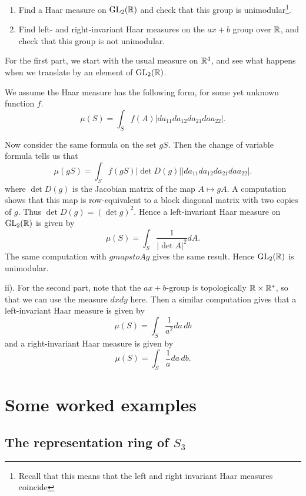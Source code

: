 \documentclass[11pt, english]{article}
\begin{document}
\begin{exc}
  \begin{enumerate}
  \item Find a Haar measure on $\operatorname{GL}_2(\mathbb{R})$ and check that this group is unimodular\footnote{Recall that this means that the left and right invariant Haar measures coincide}.
\item Find left- and right-invariant Haar measures on the $ax+b$ group over $\mathbb{R}$, and check that this group is not unimodular.
  \end{enumerate}
\end{exc}
\begin{sol}
For the first part, we start with the usual measure on $\mathbb{R}^4$, and see what happens when we translate by an element of $\operatorname{GL}_2(\mathbb{R})$. 

We assume the Haar measure has the following form, for some yet unknown function $f$.
$$
\mu(S) = \int_S f(A) \lvert da_{11} d a_{12} da_{21} da a_{22} \rvert.
$$

Now consider the same formula on the set $gS$. Then the change of variable formula tells us that
$$
\mu(gS) = \int_S f(gS) \lvert \det D(g) \rvert \lvert da_{11} d a_{12} da_{21} da a_{22} \rvert.
$$
where $\det D(g)$ is the Jacobian matrix of the map $A \mapsto gA$. A computation shows that this map is row-equivalent to a block diagonal matrix with two copies of $g$. Thus $\det D(g) = (\det g)^2$. Hence a left-invariant Haar measure on $\operatorname{GL}_2(\mathbb{R})$ is given by
$$
\mu(S) = \int_S \frac{1}{\lvert \det A\rvert ^2} dA.
$$
The same computation with $g mapsto Ag$ gives the same result. Hence $\operatorname{GL}_2(\mathbb{R})$ is unimodular.

ii). For the second part, note that the $ax+b$-group is topologically $\mathbb{R} \times \mathbb{R}^\ast$, so that we can use the measure $dxdy$ here. Then a similar computation gives that a left-invariant Haar measure is given by
$$
\mu(S) = \int_S \frac{1}{a^2} da\, db
$$
and a right-invariant Haar measure is given by
$$
\mu(S) = \int_S \frac{1}{a} da\, db.
$$

\end{sol}


\section{Some worked examples}

\subsection{The representation ring of $S_3$}
\end{document}
